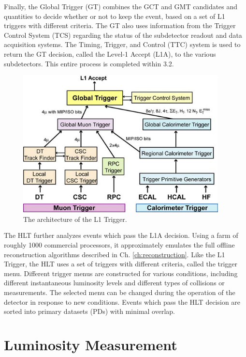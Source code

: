 Finally, the Global Trigger (GT) combines the GCT and GMT candidates and quantities to decide whether or not to keep the event, based on a set of L1 triggers with different criteria. The GT also uses information from the Trigger Control System (TCS) regarding the status of the subdetector readout and data acquisition systems. The Timing, Trigger, and Control (TTC) system is used to return the GT decision, called the Level-1 Accept (L1A), to the various subdetectors. This entire process is completed within 3.2\mus.

\begin{figure}[hbt]
\begin{center}
\includegraphics[width=0.95\textwidth]{figures/L1_architecture.png}
\caption{The architecture of the L1 Trigger.}
\label{fig:L1-trigger}
\end{center}
\end{figure}

The HLT further analyzes events which pass the L1A decision. Using a farm of roughly 1000 commercial processors, it approximately emulates the full offline reconstruction algorithms described in Ch. \ref{ch:reconstruction}. Like the L1 Trigger, the HLT uses a set of triggers with different criteria, called the trigger menu. Different trigger menus are constructed for various conditions, including different instantaneous luminosity levels and different types of collisions or measurements. The selected menu can be changed during the operation of the detector in response to new conditions. Events which pass the HLT decision are sorted into primary datasets (PDs) with minimal overlap.


\section{Luminosity Measurement}